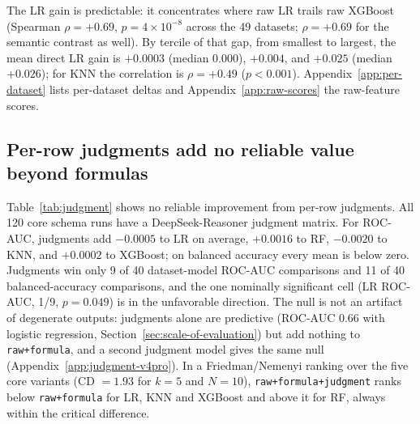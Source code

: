 The LR gain is predictable: it concentrates where raw LR trails raw XGBoost (Spearman \(\rho = +0.69\), \(p = 4 \times 10^{-8}\) across the 49 datasets; \(\rho = +0.69\) for the semantic contrast as well). By tercile of that gap, from smallest to largest, the mean direct LR gain is \(+0.0003\) (median \(0.000\)), \(+0.004\), and \(+0.025\) (median \(+0.026\)); for KNN the correlation is \(\rho = +0.49\) (\(p < 0.001\)). Appendix~\ref{app:per-dataset} lists per-dataset deltas and Appendix~\ref{app:raw-scores} the raw-feature scores.

\subsection{Per-row judgments add no reliable value beyond formulas}\label{sec:per-row-judgments-add-no-reliable-value-beyond-formulas}

Table~\ref{tab:judgment} shows no reliable improvement from per-row judgments. All 120 core schema runs have a DeepSeek-Reasoner judgment matrix. For ROC-AUC, judgments add \(-0.0005\) to LR on average, \(+0.0016\) to RF, \(-0.0020\) to KNN, and \(+0.0002\) to XGBoost; on balanced accuracy every mean is below zero. Judgments win only 9 of 40 dataset-model ROC-AUC comparisons and 11 of 40 balanced-accuracy comparisons, and the one nominally significant cell (LR ROC-AUC, 1/9, \(p = 0.049\)) is in the unfavorable direction. The null is not an artifact of degenerate outputs: judgments alone are predictive (ROC-AUC 0.66 with logistic regression, Section~\ref{sec:scale-of-evaluation}) but add nothing to \texttt{raw+formula}, and a second judgment model gives the same null (Appendix~\ref{app:judgment-v4pro}). In a Friedman/Nemenyi ranking over the five core variants (CD \(= 1.93\) for \(k = 5\) and \(N = 10\)), \texttt{raw+formula+judgment} ranks below \texttt{raw+formula} for LR, KNN and XGBoost and above it for RF, always within the critical difference.



